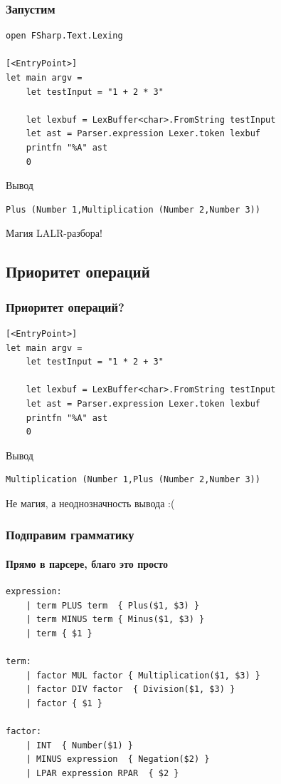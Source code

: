 \documentclass{../../slides-style}
\begin{document}
    \begin{frame}[fragile]
        \frametitle{Запустим}
        \begin{verbatim}
open FSharp.Text.Lexing

[<EntryPoint>]
let main argv =
    let testInput = "1 + 2 * 3"

    let lexbuf = LexBuffer<char>.FromString testInput
    let ast = Parser.expression Lexer.token lexbuf
    printfn "%A" ast
    0 
        \end{verbatim}
        \begin{exampleblock}{Вывод}
            \begin{verbatim}
Plus (Number 1,Multiplication (Number 2,Number 3))
            \end{verbatim}
        \end{exampleblock}
        Магия LALR-разбора!
    \end{frame}

    \subsection{Приоритет операций}

    \begin{frame}[fragile]
        \frametitle{Приоритет операций?}
        \begin{verbatim}
[<EntryPoint>]
let main argv =
    let testInput = "1 * 2 + 3"

    let lexbuf = LexBuffer<char>.FromString testInput
    let ast = Parser.expression Lexer.token lexbuf
    printfn "%A" ast
    0 
        \end{verbatim}
        \begin{exampleblock}{Вывод}
            \begin{verbatim}
Multiplication (Number 1,Plus (Number 2,Number 3))
            \end{verbatim}
        \end{exampleblock}
        Не магия, а неоднозначность вывода :(
    \end{frame}

    \begin{frame}[fragile]
        \frametitle{Подправим грамматику}
        \framesubtitle{Прямо в парсере, благо это просто}
        \begin{small}
            \begin{verbatim}
expression:
    | term PLUS term  { Plus($1, $3) }
    | term MINUS term { Minus($1, $3) }
    | term { $1 }

term:
    | factor MUL factor { Multiplication($1, $3) }
    | factor DIV factor  { Division($1, $3) }
    | factor { $1 }

factor:
    | INT  { Number($1) }
    | MINUS expression  { Negation($2) }
    | LPAR expression RPAR  { $2 }
            \end{verbatim}
        \end{small}
    \end{frame}
\end{document}
